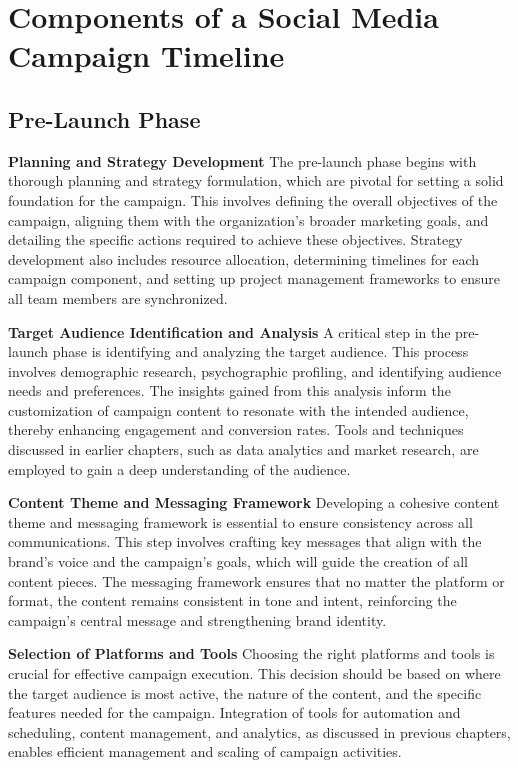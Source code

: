 \documentclass[
]{book}
\begin{document}
\hypertarget{components-of-a-social-media-campaign-timeline}{%
\section{Components of a Social Media Campaign Timeline}\label{components-of-a-social-media-campaign-timeline}}

\hypertarget{pre-launch-phase}{%
\subsection*{Pre-Launch Phase}\label{pre-launch-phase}}

\textbf{Planning and Strategy Development}
The pre-launch phase begins with thorough planning and strategy formulation, which are pivotal for setting a solid foundation for the campaign. This involves defining the overall objectives of the campaign, aligning them with the organization's broader marketing goals, and detailing the specific actions required to achieve these objectives. Strategy development also includes resource allocation, determining timelines for each campaign component, and setting up project management frameworks to ensure all team members are synchronized.

\textbf{Target Audience Identification and Analysis}
A critical step in the pre-launch phase is identifying and analyzing the target audience. This process involves demographic research, psychographic profiling, and identifying audience needs and preferences. The insights gained from this analysis inform the customization of campaign content to resonate with the intended audience, thereby enhancing engagement and conversion rates. Tools and techniques discussed in earlier chapters, such as data analytics and market research, are employed to gain a deep understanding of the audience.

\textbf{Content Theme and Messaging Framework}
Developing a cohesive content theme and messaging framework is essential to ensure consistency across all communications. This step involves crafting key messages that align with the brand's voice and the campaign's goals, which will guide the creation of all content pieces. The messaging framework ensures that no matter the platform or format, the content remains consistent in tone and intent, reinforcing the campaign's central message and strengthening brand identity.

\textbf{Selection of Platforms and Tools}
Choosing the right platforms and tools is crucial for effective campaign execution. This decision should be based on where the target audience is most active, the nature of the content, and the specific features needed for the campaign. Integration of tools for automation and scheduling, content management, and analytics, as discussed in previous chapters, enables efficient management and scaling of campaign activities.
\end{document}
